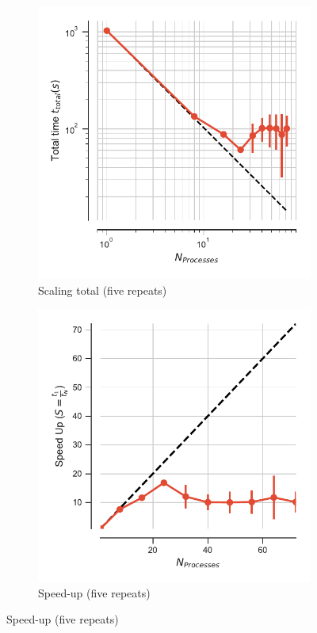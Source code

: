 \begin{figure}
\centering
\begin{subfigure}{.4\textwidth}
  \includegraphics[width=\linewidth]{figures/main-RMSD-t_total.pdf}
  \captionsetup{format=hang}
  \caption{Scaling total (five repeats)}
  \label{fig:MPIscaling}
\end{subfigure}
\hfill
\begin{subfigure}{.4\textwidth}
  \includegraphics[width=\linewidth]{figures/main-RMSD-speed_up.pdf}
  \captionsetup{format=hang}
  \caption{Speed-up (five repeats)}
  \label{fig:MPIspeedup}
\end{subfigure}
\bigskip


\end{figure}

